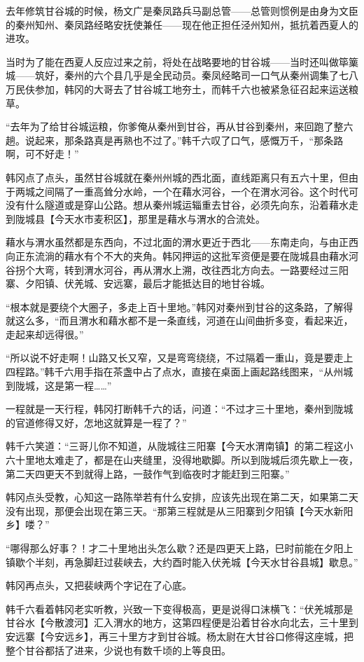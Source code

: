 去年修筑甘谷城的时候，杨文广是秦凤路兵马副总管——总管则惯例是由身为文臣的秦州知州、秦凤路经略安抚使兼任——现在他正担任泾州知州，抵抗着西夏人的进攻。

当时为了能在西夏人反应过来之前，将处在战略要地的甘谷城——当时还叫做筚篥城——筑好，秦州的六个县几乎是全民动员。秦凤经略司一口气从秦州调集了七八万民伕参加，韩冈的大哥去了甘谷城工地夯土，而韩千六也被紧急征召起来运送粮草。

“去年为了给甘谷城运粮，你爹俺从秦州到甘谷，再从甘谷到秦州，来回跑了整六趟。说起来，那条路真是再熟也不过了。”韩千六叹了口气，感慨万千，“那条路啊，可不好走！”

韩冈点了点头，虽然甘谷城就在秦州州城的西北面，直线距离只有五六十里，但由于两城之间隔了一重高耸分水岭，一个在藉水河谷，一个在渭水河谷。这个时代可没有什么隧道或是穿山公路。想从秦州城运辎重去甘谷，必须先向东，沿着藉水走到陇城县【今天水市麦积区】，那里是藉水与渭水的合流处。

藉水与渭水虽然都是东西向，不过北面的渭水更近于西北——东南走向，与由正西向正东流淌的藉水有个不大的夹角。韩冈押运的这批军资便是要在陇城县由藉水河谷拐个大弯，转到渭水河谷，再从渭水上溯，改往西北方向去。一路要经过三阳寨、夕阳镇、伏羌城、安远寨，最后才能抵达目的地甘谷城。

“根本就是要绕个大圈子，多走上百十里地。”韩冈对秦州到甘谷的这条路，了解得就这么多，“而且渭水和藉水都不是一条直线，河道在山间曲折多变，看起来近，走起来却远得很。”

“所以说不好走啊！山路又长又窄，又是弯弯绕绕，不过隔着一重山，竟是要走上四程路。”韩千六用手指在茶盏中占了点水，直接在桌面上画起路线图来，“从州城到陇城，这是第一程……”

一程就是一天行程，韩冈打断韩千六的话，问道：“不过才三十里地，秦州到陇城的官道修得又好，怎地这就算是一程了？”

韩千六笑道：“三哥儿你不知道，从陇城往三阳寨【今天水渭南镇】的第二程这小六十里地太难走了，都是在山夹缝里，没得地歇脚。所以到陇城后须先歇上一夜，第二天四更天不到就得上路，一鼓作气到临夜时才能赶到三阳寨。”

韩冈点头受教，心知这一路陈举若有什么安排，应该先出现在第二天，如果第二天没有出现，那便会出现在第三天。“那第三程就是从三阳寨到夕阳镇【今天水新阳乡】喽？”

“哪得那么好事？！才二十里地出头怎么歇？还是四更天上路，巳时前能在夕阳上镇歇个半刻，再急脚赶过裴峡去，大约酉时能入伏羌城【今天水甘谷县城】歇息。”

韩冈再点头，又把裴峡两个字记在了心底。

韩千六看着韩冈老实听教，兴致一下变得极高，更是说得口沫横飞：“伏羌城那是甘谷水【今散渡河】汇入渭水的地方，这第四程便是沿着甘谷水向北去，三十里到安远寨【今安远乡】，再三十里方才到甘谷城。杨太尉在大甘谷口修得这座城，把整个甘谷都括了进来，少说也有数千顷的上等良田。

